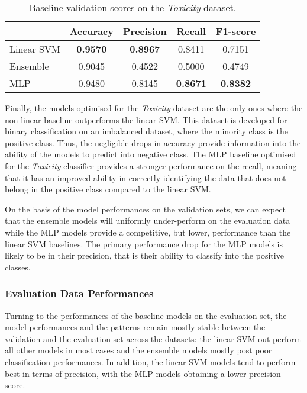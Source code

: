 \begin{table}[h]
  \centering
  \begin{tabular}{l|cccc}
                & Accuracy        & Precision       & Recall          & F1-score        \\ \hline
    Linear SVM  & \textbf{0.9570} & \textbf{0.8967} & 0.8411          & 0.7151          \\
    Ensemble    & 0.9045          & 0.4522          & 0.5000          & 0.4749          \\
    MLP         & 0.9480          & 0.8145          & \textbf{0.8671} & \textbf{0.8382}
  \end{tabular}
  \caption{Baseline validation scores on the \textit{Toxicity} dataset.}
  \label{tab:baseline_dev_wulczyn}
\end{table}

Finally, the models optimised for the \textit{Toxicity} dataset are the only ones where the non-linear baseline outperforms the linear SVM.
This dataset is developed for binary classification on an imbalanced dataset, where the minority class is the positive class.
Thus, the negligible drops in accuracy provide information into the ability of the models to predict into negative class.
The MLP baseline optimised for the \textit{Toxicity} classifier provides a stronger performance on the recall, meaning that it has an improved ability in correctly identifying the data that does not belong in the positive class compared to the linear SVM.

On the basis of the model performances on the validation sets, we can expect that the ensemble models will uniformly under-perform on the evaluation data while the MLP models provide a competitive, but lower, performance than the linear SVM baselines.
The primary performance drop for the MLP models is likely to be in their precision, that is their ability to classify into the positive classes.\vspace{5mm}

\subsubsection{Evaluation Data Performances}
Turning to the performances of the baseline models on the evaluation set, the model performances and the patterns remain mostly stable between the validation and the evaluation set across the datasets: the linear SVM out-perform all other models in most cases and the ensemble models mostly post poor classification performances.
In addition, the linear SVM models tend to perform best in terms of precision, with the MLP models obtaining a lower precision score.

